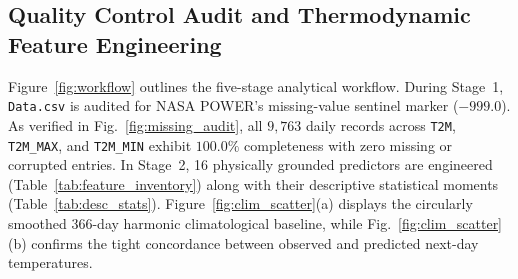 \documentclass[conference]{IEEEtran}
\begin{document}
\subsection{Quality Control Audit and Thermodynamic Feature Engineering}
Figure~\ref{fig:workflow} outlines the five-stage analytical workflow. During Stage~1, \texttt{Data.csv} is audited for NASA POWER's missing-value sentinel marker ($-999.0$). As verified in Fig.~\ref{fig:missing_audit}, all $9,763$ daily records across \texttt{T2M}, \texttt{T2M\_MAX}, and \texttt{T2M\_MIN} exhibit $100.0\%$ completeness with zero missing or corrupted entries. In Stage~2, 16 physically grounded predictors are engineered (Table~\ref{tab:feature_inventory}) along with their descriptive statistical moments (Table~\ref{tab:desc_stats}). Figure~\ref{fig:clim_scatter}(a) displays the circularly smoothed 366-day harmonic climatological baseline, while Fig.~\ref{fig:clim_scatter}(b) confirms the tight concordance between observed and predicted next-day temperatures.
\end{document}
